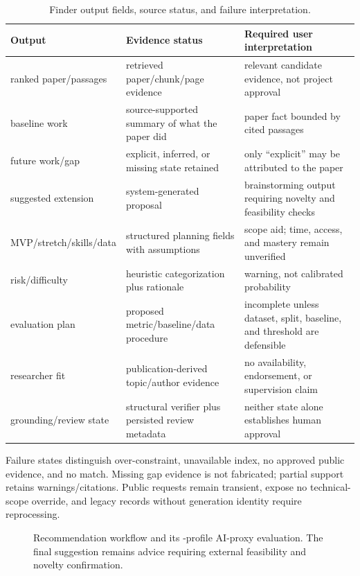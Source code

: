 \begin{table}[htbp]
\centering
\small
\caption{Finder output fields, source status, and failure interpretation.}
\label{tab:finder-contract}
\begin{tabularx}{\textwidth}{P{37mm}P{48mm}Y}
\toprule
Output & Evidence status & Required user interpretation \\
\midrule
ranked paper/passages & retrieved paper/chunk/page evidence & relevant candidate evidence, not project approval \\
baseline work & source-supported summary of what the paper did & paper fact bounded by cited passages \\
future work/gap & explicit, inferred, or missing state retained & only ``explicit'' may be attributed to the paper \\
suggested extension & system-generated proposal & brainstorming output requiring novelty and feasibility checks \\
MVP/stretch/skills/data & structured planning fields with assumptions & scope aid; time, access, and mastery remain unverified \\
risk/difficulty & heuristic categorization plus rationale & warning, not calibrated probability \\
evaluation plan & proposed metric/baseline/data procedure & incomplete unless dataset, split, baseline, and threshold are defensible \\
researcher fit & publication-derived topic/author evidence & no availability, endorsement, or supervision claim \\
grounding/review state & structural verifier plus persisted review metadata & neither state alone establishes human approval \\
\bottomrule
\end{tabularx}
\end{table}

Failure states distinguish over-constraint, unavailable index, no approved public evidence, and no match. Missing gap evidence is not fabricated; partial support retains warnings/citations. Public requests remain transient, expose no technical-scope override, and legacy records without generation identity require reprocessing.

\begin{figure}[htbp]
\centering
\resizebox{0.99\textwidth}{!}{}
\caption[Recommendation workflow and AI-proxy evaluation.]{Recommendation workflow and its \RecommendationProfileCount{}-profile AI-proxy evaluation. The final suggestion remains advice requiring external feasibility and novelty confirmation.}
\label{fig:recommendation-workflow}
\end{figure}

